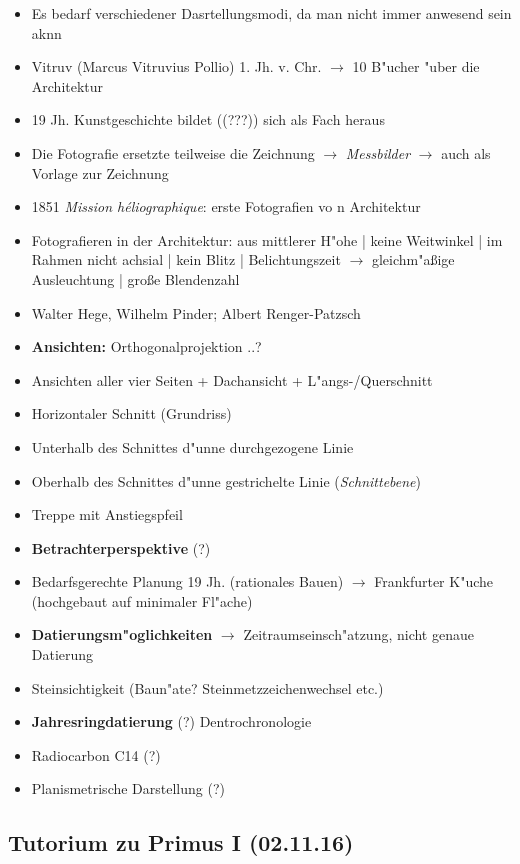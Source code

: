 \documentclass[emulatestandardclasses]{scrartcl}
\begin{document}
\begin{itemize}
  \item Es bedarf verschiedener Dasrtellungsmodi, da man nicht immer anwesend sein aknn
  \item Vitruv (Marcus Vitruvius Pollio) 1. Jh. v. Chr. $\rightarrow$ 10 B"ucher "uber die Architektur
  \item 19 Jh. Kunstgeschichte bildet ({\color{red}(???)}) sich als Fach heraus
  \item Die Fotografie ersetzte teilweise die Zeichnung $\rightarrow$ \emph{Messbilder} $\rightarrow$ auch als Vorlage zur Zeichnung
  \item 1851 \emph{Mission h\'{e}liographique}: erste Fotografien vo n Architektur
  \item Fotografieren in der Architektur: aus mittlerer H"ohe | keine Weitwinkel | im Rahmen nicht achsial | kein Blitz | Belichtungszeit $\rightarrow$ gleichm"a\ss ige Ausleuchtung | gro\ss e Blendenzahl
  \item Walter Hege, Wilhelm Pinder; Albert Renger-Patzsch
  \item \textbf{Ansichten:} {\color{red}Orthogonalprojektion ..?} 
  \item Ansichten aller vier Seiten + Dachansicht + L"angs-/Querschnitt
  \item Horizontaler Schnitt (Grundriss)
  \item Unterhalb des Schnittes d"unne durchgezogene Linie
  \item Oberhalb des Schnittes d"unne gestrichelte Linie (\emph{Schnittebene})
  \item Treppe mit Anstiegspfeil
  \item \textbf{Betrachterperspektive} {\color{red}(?)} 
  \item Bedarfsgerechte Planung 19 Jh. (rationales Bauen) $\rightarrow$ Frankfurter K"uche (hochgebaut auf minimaler Fl"ache)
  \item \textbf{Datierungsm"oglichkeiten} $\rightarrow$ Zeitraumseinsch"atzung, nicht genaue Datierung
  \item Steinsichtigkeit (Baun"ate? Steinmetzzeichenwechsel etc.) 
  \item \textbf{Jahresringdatierung} {\color{red}(?)} Dentrochronologie
  \item Radiocarbon C14 {\color{red}(?)}
  \item Planismetrische Darstellung {\color{red}(?)}
\end{itemize}


\subsection{Tutorium zu Primus I (02.11.16)}
\end{document}
